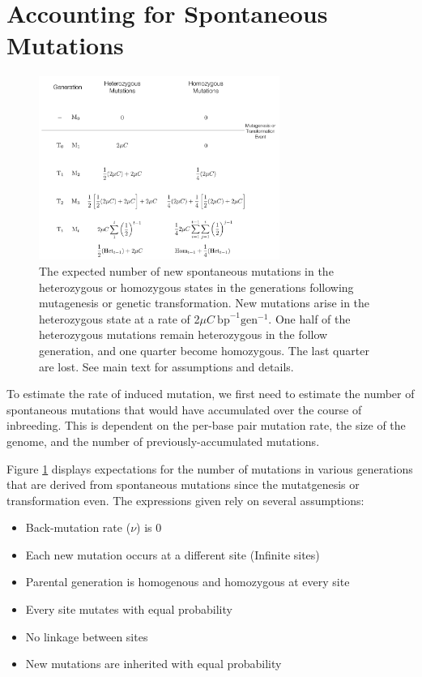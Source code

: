 \documentclass[12pt]{article}
\begin{document}
\section*{Accounting for Spontaneous Mutations}
\begin{figure}[h]
    \centering
    \includegraphics[width=0.7\textwidth]{Spontaneous_Mutations}
    \caption{The expected number of new spontaneous mutations in the
    heterozygous or homozygous states in the generations following mutagenesis
    or genetic transformation. New mutations arise in the heterozygous state at
    a rate of 2$\mu C ~\mathrm{bp}^{-1}\mathrm{gen}^{-1}$. One half of the
    heterozygous mutations remain heterozygous in the follow generation, and
    one quarter become homozygous. The last quarter are lost. See main text
    for assumptions and details.}
    \label{fig:fig1}
\end{figure}

\par To estimate the rate of induced mutation, we first need to estimate the
number of spontaneous mutations that would have accumulated over the course
of inbreeding. This is dependent on the per-base pair mutation rate, the size
of the genome, and the number of previously-accumulated mutations.

\par Figure \ref{fig:fig1} displays expectations for the number of mutations in
various generations that are derived from spontaneous mutations since the
mutatgenesis or transformation even. The expressions given rely on several
assumptions:
\begin{itemize}
    \item Back-mutation rate ($\nu$) is 0
    \item Each new mutation occurs at a different site (Infinite sites)
    \item Parental generation is homogenous and homozygous at every site
    \item Every site mutates with equal probability
    \item No linkage between sites
    \item New mutations are inherited with equal probability
\end{itemize}
\end{document}
